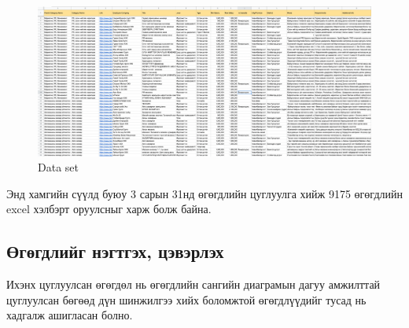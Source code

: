 \begin{figure}[ht]
  \centering
  \includegraphics[width=\textwidth]{images/dataSet.png}
  \caption{Data set}
  \label{fig:dataSet}
\end{figure}
Энд хамгийн сүүлд буюу 3 сарын 31нд өгөгдлийн цуглуулга хийж 9175 өгөгдлийн excel хэлбэрт оруулсныг харж болж байна. 
\subsection{Өгөгдлийг нэгтгэх, цэвэрлэх}
Ихэнх цуглуулсан өгөгдөл нь өгөгдлийн сангийн диаграмын дагуу амжилттай цуглуулсан бөгөөд дүн шинжилгээ хийх боломжтой өгөгдлүүдийг тусад нь хадгалж ашигласан болно. 